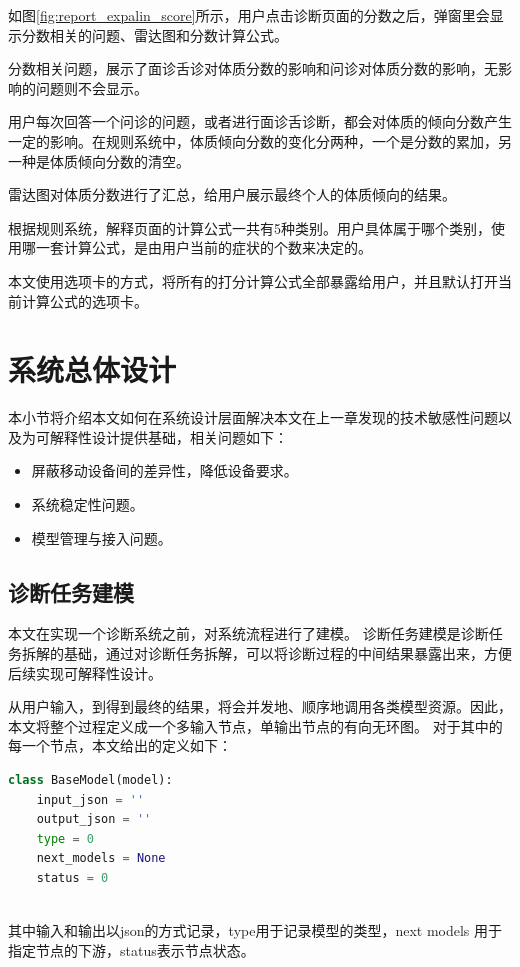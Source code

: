 如图\ref{fig:report_expalin_score}所示，用户点击诊断页面的分数之后，弹窗里会显示分数相关的问题、雷达图和分数计算公式。

分数相关问题，展示了面诊舌诊对体质分数的影响和问诊对体质分数的影响，无影响的问题则不会显示。

用户每次回答一个问诊的问题，或者进行面诊舌诊断，都会对体质的倾向分数产生一定的影响。在规则系统中，体质倾向分数的变化分两种，一个是分数的累加，另一种是体质倾向分数的清空。

雷达图对体质分数进行了汇总，给用户展示最终个人的体质倾向的结果。

根据规则系统，解释页面的计算公式一共有5种类别。用户具体属于哪个类别，使用哪一套计算公式，是由用户当前的症状的个数来决定的。

本文使用选项卡的方式，将所有的打分计算公式全部暴露给用户，并且默认打开当前计算公式的选项卡。


\section{系统总体设计}

本小节将介绍本文如何在系统设计层面解决本文在上一章发现的技术敏感性问题以及为可解释性设计提供基础，相关问题如下：
\begin{itemize}
    \item 屏蔽移动设备间的差异性，降低设备要求。
    \item 系统稳定性问题。
    \item 模型管理与接入问题。
\end{itemize}

\subsection{诊断任务建模}
本文在实现一个诊断系统之前，对系统流程进行了建模。
诊断任务建模是诊断任务拆解的基础，通过对诊断任务拆解，可以将诊断过程的中间结果暴露出来，方便后续实现可解释性设计。

从用户输入，到得到最终的结果，将会并发地、顺序地调用各类模型资源。因此，本文将整个过程定义成一个多输入节点，单输出节点的有向无环图。
对于其中的每一个节点，本文给出的定义如下：
\begin{lstlisting}[language={Python}, title=model.py]
class BaseModel(model):
    input_json = ''
    output_json = ''
    type = 0
    next_models = None
    status = 0
    
\end{lstlisting}

其中输入和输出以json的方式记录，type用于记录模型的类型，next models 用于指定节点的下游，status表示节点状态。


